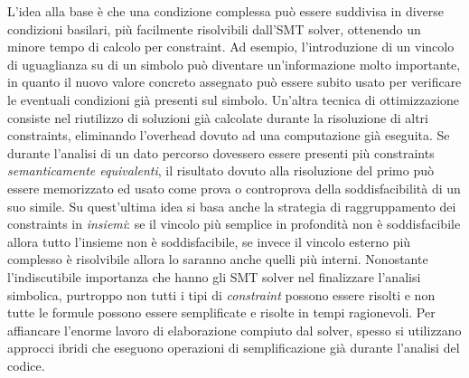 \documentclass[Lau, oneside]{sapthesis}%
\begin{document}
\newline
L'idea alla base è che una condizione complessa può essere suddivisa in diverse condizioni basilari, più facilmente risolvibili dall'SMT solver, ottenendo un minore tempo di calcolo per constraint.
\newline
Ad esempio, l'introduzione di un vincolo di uguaglianza su di un simbolo può diventare un'informazione molto importante, in quanto il nuovo valore concreto assegnato può essere subito usato per verificare le eventuali condizioni già presenti sul simbolo.
\newline \newline
Un'altra tecnica di ottimizzazione consiste nel riutilizzo di soluzioni già calcolate durante la risoluzione di altri constraints, eliminando l'overhead dovuto ad una computazione già eseguita.
\newline
Se durante l'analisi di un dato percorso dovessero essere presenti più constraints \textit{semanticamente equivalenti}, il risultato dovuto alla risoluzione del primo può essere memorizzato ed usato come prova o controprova della soddisfacibilità di un suo simile.
\newline \newline
Su quest'ultima idea si basa anche la strategia di raggruppamento dei constraints in \textit{insiemi}: se il vincolo più semplice in profondità non è soddisfacibile allora tutto l'insieme non è soddisfacibile, se invece il vincolo esterno più complesso è risolvibile allora lo saranno anche quelli più interni.
\newline \newline \newline
Nonostante l'indiscutibile importanza che hanno gli SMT solver nel finalizzare l'analisi simbolica, purtroppo non tutti i tipi di \textit{constraint} possono essere risolti e non tutte le formule possono essere semplificate e risolte in tempi ragionevoli.
\newline
Per affiancare l'enorme lavoro di elaborazione compiuto dal solver, spesso si utilizzano approcci ibridi che eseguono operazioni di semplificazione già durante l'analisi del codice.





\newpage
\end{document}
